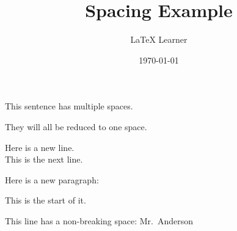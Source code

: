 \documentclass{article}
\title{Spacing Example}
\author{LaTeX Learner}
\date{\today}
\begin{document}
\maketitle

This    sentence       has  multiple     spaces.

They will all be reduced to one space.

Here is a new line.\\
This is the next line.

Here is a new paragraph:%


This is the start of it.





This line has a non-breaking space: Mr.~Anderson
\end{document}
